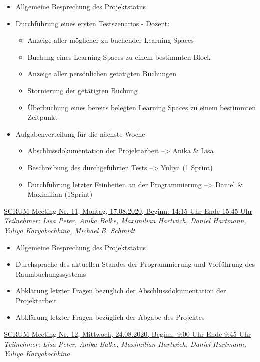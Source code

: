 \documentclass[a4paper,report,headsepline]{scrreprt}
\begin{document}
\begin{itemize}
\item Allgemeine Besprechung des Projektstatus
\item Durchführung eines ersten Testszenarios - Dozent: 
\begin{itemize}
\item Anzeige aller möglicher zu buchender Learning Spaces
\item Buchung eines Learning Spaces zu einem bestimmten Block
\item Anzeige aller persönlichen getätigten Buchungen
\item Stornierung der getätigten Buchung
\item Überbuchung eines bereits belegten Learning Spaces zu einem bestimmten Zeitpunkt
\end{itemize}
\item Aufgabenverteilung für die nächste Woche
\begin{itemize}
\item Abschlussdokumentation der Projektarbeit --> Anika \& Lisa
\item Beschreibung des durchgeführten Tests --> Yuliya (1 Sprint)
\item Durchführung letzter Feinheiten an der Programmierung --> Daniel \& Maximilian (1Sprint)

\end{itemize}
\end{itemize}
\underline{{\large SCRUM-Meeting Nr. 11, Montag, 17.08.2020, Beginn: 14:15 Uhr Ende 15:45 Uhr }} \\
\textit{Teilnehmer: Lisa Peter, Anika Balke, Maximilian Hartwich, Daniel Hartmann, Yuliya Karyabochkina, Michael B. Schmidt }

\begin{itemize}
\item Allgemeine Besprechung des Projektstatus 
\item Durchsprache des aktuellen Standes der Programmierung und Vorführung des Raumbuchungssystems 
\item Abklärung letzter Fragen bezüglich der Abschlussdokumentation der Projektarbeit 
\item Abklärung letzter Fragen bezüglich der Abgabe des Projektes 
\end{itemize}
\underline{{\large SCRUM-Meeting Nr. 12, Mittwoch, 24.08.2020, Beginn: 9:00 Uhr Ende 9:45 Uhr}} \\
\textit{Teilnehmer: Lisa Peter, Anika Balke, Maximilian Hartwich, Daniel Hartmann, Yuliya Karyabochkina}
\end{document}
